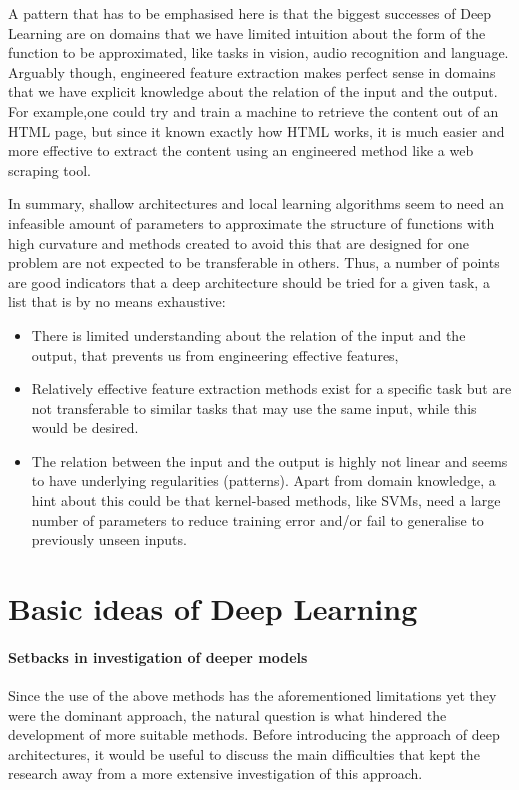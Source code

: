 \documentclass[a4paper]{article}
\begin{document}
		A pattern that has to be emphasised here is that the biggest successes of Deep Learning are on domains that we have limited intuition about the form of the function to be approximated, like tasks in vision, audio recognition and language. Arguably though, engineered feature extraction makes perfect sense in domains that we have explicit knowledge about the relation of the input and the output. For example,one could try and train a machine to retrieve the content out of an HTML page, but since it known exactly how HTML works, it is much easier and more effective to extract the content using an engineered method like a web scraping tool.
	
	In summary, shallow architectures and local learning algorithms seem to need an infeasible amount of parameters to approximate the structure of functions with high curvature and methods created to avoid this that are designed for one problem are not expected to be transferable in others. Thus, a number of points are good indicators that a deep architecture should be tried for a given task, a list that is by no means exhaustive: 
	\begin{itemize}
		\item There is limited understanding about the relation of the input and the output, that prevents us from engineering effective features,
		\item Relatively effective feature extraction methods exist for a specific task but are not transferable to similar tasks that may use the same input, while this would be desired.
		\item The relation between the input and the output is highly not linear and seems to have underlying regularities (patterns). Apart from domain knowledge, a hint about this could be that kernel-based methods, like SVMs, need a large number of parameters to reduce training error and/or fail to generalise to previously unseen inputs.
	\end{itemize}
\section{Basic ideas of Deep Learning}
	\label{sec:Basic ideas}
	\paragraph{Setbacks in investigation of deeper models}
		Since the use of the above methods has the aforementioned limitations yet they were the dominant approach, the natural question is what hindered the development of more suitable methods. Before introducing the approach of deep architectures, it would be useful to discuss the main difficulties that kept the research away from a more extensive investigation of this approach.
		
\end{document}

